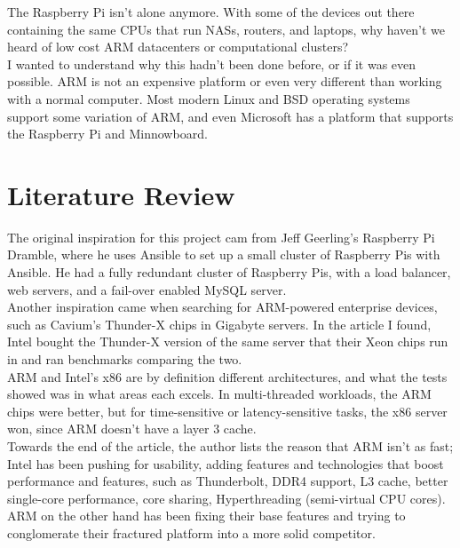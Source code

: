 \documentclass[12pt]{spieman}  %
\begin{document}
The Raspberry Pi isn’t alone anymore. With some of the devices out there containing the same CPUs that run NASs, routers, and laptops, why haven't we heard of low cost ARM datacenters or computational clusters?\\

I wanted to understand why this hadn’t been done before, or if it was even possible. ARM is not an expensive platform or even very different than working with a normal computer. Most modern Linux and BSD operating systems support some variation of ARM, and even Microsoft has a platform that supports the Raspberry Pi and Minnowboard.\\

\section{Literature Review}
\label{sec:lit-rev}

The original inspiration for this project cam from Jeff Geerling's Raspberry Pi Dramble\cite{geerlingdramble}, where he uses Ansible to set up a small cluster of Raspberry Pis with Ansible. He had a fully redundant cluster of Raspberry Pis, with a load balancer, web servers, and a fail-over enabled MySQL server.\\

Another inspiration came when searching for ARM-powered enterprise devices, such as Cavium's Thunder-X chips in Gigabyte servers. In the article I found, Intel bought the Thunder-X version of the same server that their Xeon chips run in and ran benchmarks comparing the two.\cite{morganarmxeon}\\

ARM and Intel's x86 are by definition different architectures, and what the tests showed was in what areas each excels. In multi-threaded workloads, the ARM chips were better, but for time-sensitive or latency-sensitive tasks, the x86 server won, since ARM doesn't have a layer 3 cache.\\

Towards the end of the article, the author lists the reason that ARM isn't as fast; Intel has been pushing for usability, adding features and technologies that boost performance and features, such as Thunderbolt, DDR4 support, L3 cache, better single-core performance, core sharing, Hyperthreading (semi-virtual CPU cores). ARM on the other hand has been fixing their base features and trying to conglomerate their fractured platform into a more solid competitor.\\
\end{document}
